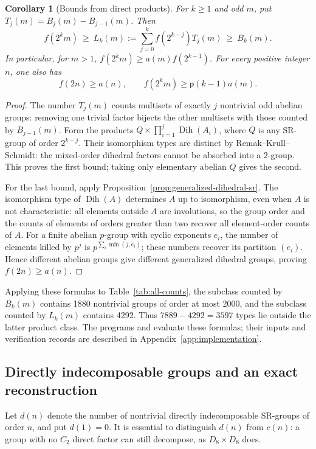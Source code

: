 \documentclass[11pt,a4paper]{amsart}
\newtheorem{corl}[thm]{Corollary}
\theoremstyle{definition}
\theoremstyle{remark}
\numberwithin{equation}{section}
\begin{document}
\begin{corl}[Bounds from direct products]\label{prop:arithmetic-bounds}
For $k\ge1$ and odd $m$, put $T_j(m)=B_j(m)-B_{j-1}(m)$. Then
\begin{equation}\label{eq:strengthened-bound}
 f(2^k m)\ \ge\
 L_k(m):=\sum_{j=0}^k f(2^{k-j})T_j(m)
 \ \ge\ B_k(m).
\end{equation}
In particular, for $m>1$,
$f(2^k m)\ge a(m)f(2^{k-1})$.
For every positive integer $n$, one also has
\begin{equation}\label{eq:general-dihedral-bound}
 f(2n)\ge a(n),\qquad
 f(2^k m)\ge\mathsf p(k-1)a(m).
\end{equation}
\end{corl}
\begin{proof}
The number $T_j(m)$ counts multisets of exactly $j$ nontrivial
odd abelian groups: removing one trivial factor bijects the other
multisets with those counted by $B_{j-1}(m)$. Form the products
$Q\times\prod_{i=1}^j\operatorname{Dih}(A_i)$, where $Q$ is
any SR-group of order $2^{k-j}$. Their isomorphism types are distinct
by Remak--Krull--Schmidt: the mixed-order dihedral factors cannot be
absorbed into a $2$-group. This proves the first bound; taking only
elementary abelian $Q$ gives the second.

For the last bound, apply
Proposition~\ref{prop:generalized-dihedral-sr}.
The isomorphism type of $\operatorname{Dih}(A)$ determines $A$ up to
isomorphism, even when $A$ is not characteristic: all elements outside
$A$ are involutions, so the group order and the counts of elements
of orders greater than two recover all element-order counts of $A$.
For a finite abelian $p$-group with cyclic exponents $e_i$, the number
of elements killed by $p^j$ is $p^{\sum_i\min(j,e_i)}$; these numbers
recover its partition $(e_i)$. Hence different abelian groups give
different generalized dihedral groups, proving $f(2n)\ge a(n)$.
\end{proof}

Applying these formulas to Table~\ref{tab:all-counts}, the subclass
counted by $B_k(m)$ contains 1880 nontrivial groups of order at most
2000, and the subclass counted by $L_k(m)$ contains 4292. Thus
$7889-4292=3597$ types lie outside the latter product class.
The programs  and
 evaluate these formulas; their inputs
and verification records are described in
Appendix~\ref{app:implementation}.

\subsection{Directly indecomposable groups and an exact reconstruction}
Let $d(n)$ denote the number of nontrivial directly indecomposable
SR-groups of order $n$, and put $d(1)=0$.
It is essential to distinguish $d(n)$ from $c(n)$: a group with no
$C_2$ direct factor can still decompose, as $D_8\times D_8$ does.
\end{document}
